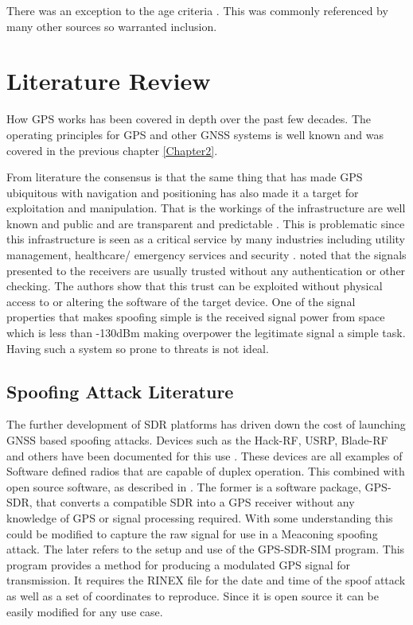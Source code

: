 There was an exception to the age criteria \cite{RN11}. This was commonly referenced by many other sources so warranted inclusion. 


\section{Literature Review}
How GPS works has been covered in depth over the past few decades. The operating principles for GPS and other GNSS systems is well known and was covered in the previous
chapter \ref{Chapter2}.

From literature the consensus is that the same thing that has made GPS ubiquitous with navigation and 
positioning has also made it a target for exploitation and manipulation. That is the workings
of the infrastructure are well known and public and are transparent and predictable \cite{RN7} \cite{RN4}. This is problematic since this infrastructure
is seen as a critical service by many industries including utility management, healthcare/ emergency services and security \cite{RN12} \cite{RN32}. \textcite{RN28} noted that the signals
presented to the receivers are usually trusted without any authentication or other checking. The authors show that this trust can be exploited without physical access to
or altering the software of the target device. One of the signal properties that makes spoofing simple is the received signal power from space which is less than -130dBm
making overpower the legitimate signal a simple task. Having such a system so prone to threats is not ideal. 

%
%

\subsection{Spoofing Attack Literature} \label{Subsec:SpoofLit}
The further development of SDR platforms has driven down the cost of launching GNSS based spoofing attacks. Devices such as the Hack-RF, USRP, Blade-RF and others have
been documented for this use \cite{RN4} \cite{RN9}. These devices are all examples of Software defined radios that are capable of duplex operation. This combined with
open source software, as described in \cite{RN4} \cite{RN16} \cite{RN57}. The former is a software package, GPS-SDR, that converts a compatible SDR into a GPS receiver
without any knowledge of GPS or signal processing required. With some understanding this could be modified to capture the raw signal for use in a Meaconing spoofing
attack. The later refers to the setup and use of the GPS-SDR-SIM program. This program provides a method for producing a modulated GPS signal for transmission. It
requires the RINEX file for the date and time of the spoof attack as well as a set of coordinates to reproduce. Since it is open source it can be easily modified for any
use case. 

